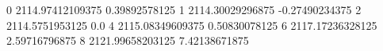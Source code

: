 0 2114.97412109375 0.39892578125
1 2114.30029296875 -0.27490234375
2 2114.5751953125 0.0
4 2115.08349609375 0.50830078125
6 2117.17236328125 2.59716796875
8 2121.99658203125 7.42138671875
